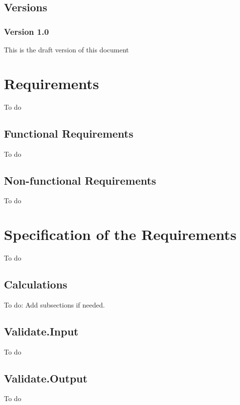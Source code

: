 \documentclass[signature]{deltares_manual}
\begin{document}
\section{Versions}
\label{sec:Versions}

\subsection{Version 1.0}
\label{sec:Version}
This is the draft version of this document

\chapter{Requirements}
\label{sec:Requirements}
To do

\section{Functional Requirements}
\label{sec:FunctionalRequirements}
To do

\section{Non-functional Requirements}
\label{sec:NonFunctionalRequirements}
To do

\chapter{Specification of the Requirements}
\label{sec:SpecificationOfTheRequirements}
To do

\section{Calculations}
\label{sec:Calculations}
To do: Add subsections if needed. 

\section{Validate.Input}
\label{sec:ValidateInput}
To do

\section{Validate.Output}
\label{sec:ValidateOutput}
To do
\end{document}
